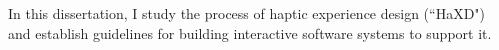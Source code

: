 In this dissertation, I study the process of haptic experience design (``HaXD") and establish guidelines for building interactive software systems to support it.
%
%
%
%
%
%
%
